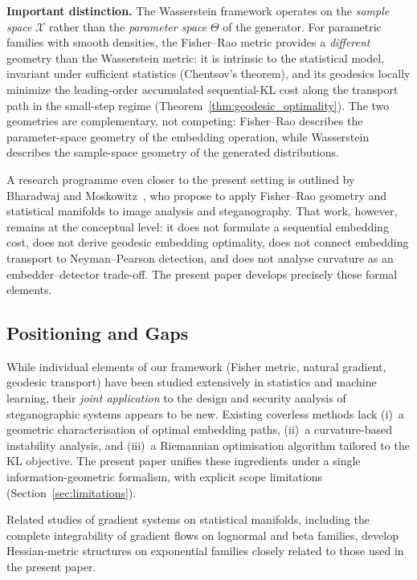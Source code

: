 \documentclass[a4paper,fleqn]{cas-dc}
\begin{document}
\textbf{Important distinction.}
The Wasserstein framework operates on the \emph{sample space}
$\mathcal{X}$ rather than the \emph{parameter space} $\Theta$ of the
generator.
For parametric families with smooth densities, the Fisher--Rao metric
provides a \emph{different} geometry than the Wasserstein metric: it is
intrinsic to the statistical model, invariant under sufficient
statistics (Chentsov's theorem), and its geodesics locally minimize the leading-order accumulated sequential-KL cost along the transport path in the small-step regime (Theorem~\ref{thm:geodesic_optimality}).
The two geometries are complementary, not competing: Fisher--Rao
describes the parameter-space geometry of the embedding operation,
while Wasserstein describes the sample-space geometry of the generated
distributions.

A research programme even closer to the present setting is outlined by
Bharadwaj and Moskowitz~\cite{moskowitz2018assuring}, who propose to apply
Fisher--Rao geometry and statistical manifolds to image analysis and
steganography.
That work, however, remains at the conceptual level: it does not formulate a
sequential embedding cost, does not derive geodesic embedding optimality, does
not connect embedding transport to Neyman--Pearson detection, and does not
analyse curvature as an embedder--detector trade-off.
The present paper develops precisely these formal elements.

\subsection{Positioning and Gaps}

While individual elements of our framework (Fisher metric, natural
gradient, geodesic transport) have been studied extensively in
statistics and machine learning, their \emph{joint application} to the
design and security analysis of steganographic systems appears to be new.
Existing coverless methods lack (i)~a geometric characterisation of
optimal embedding paths, (ii)~a curvature-based instability analysis,
and (iii)~a Riemannian optimisation algorithm tailored to the KL
objective.
The present paper unifies these ingredients under a single
information-geometric formalism, with explicit scope limitations
(Section~\ref{sec:limitations}).

Related studies of gradient systems on statistical manifolds, including the complete integrability of gradient flows on lognormal
and beta families, develop Hessian-metric structures on exponential families closely related
to those used in the present paper.
\end{document}
